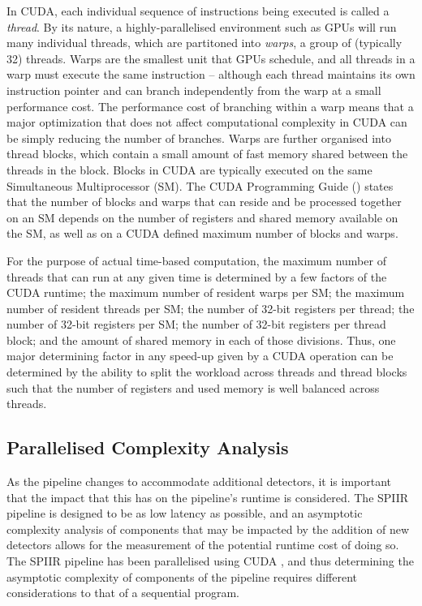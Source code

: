 \documentclass{article}
\begin{document}
In CUDA, each individual sequence of instructions being executed is called a \textit{thread}.
By its nature, a highly-parallelised environment such as GPUs will run many individual threads, which are partitoned into \textit{warps}, a group of (typically 32) threads.
Warps are the smallest unit that GPUs schedule, and all threads in a warp must execute the same instruction -- although each thread maintains its own instruction pointer and can branch independently from the warp at a small performance cost.
The performance cost of branching within a warp means that a major optimization that does not affect computational complexity in CUDA can be simply reducing the number of branches.
Warps are further organised into thread blocks, which contain a small amount of fast memory shared between the threads in the block.
Blocks in CUDA are typically executed on the same Simultaneous Multiprocessor (SM).
The CUDA Programming Guide (\cite{CUDA_Guide}) states that the number of blocks and warps that can reside and be processed together on an SM depends on the number of registers and shared memory available on the SM, as well as on a CUDA defined maximum number of blocks and warps.

For the purpose of actual time-based computation, the maximum number of threads that can run at any given time is determined by a few factors of the CUDA runtime; the maximum number of resident warps per SM; the maximum number of resident threads per SM; the number of 32-bit registers per thread; the number of 32-bit registers per SM; the number of 32-bit registers per thread block; and the amount of shared memory in each of those divisions.
Thus, one major determining factor in any speed-up given by a CUDA operation can be determined by the ability to split the workload across threads and thread blocks such that the number of registers and used memory is well balanced across threads.

\subsection{Parallelised Complexity Analysis} \label{sec:lit_review:par_comp_analysis}

As the pipeline changes to accommodate additional detectors, it is important that the impact that this has on the pipeline's runtime is considered.
The SPIIR pipeline is designed to be as low latency as possible, and an asymptotic complexity analysis of components that may be impacted by the addition of new detectors allows for the measurement of the potential runtime cost of doing so.
The SPIIR pipeline has been parallelised using CUDA \cite{SPIIRGPU2018}, and thus determining the asymptotic complexity of components of the pipeline requires different considerations to that of a sequential program.
\\
\end{document}
